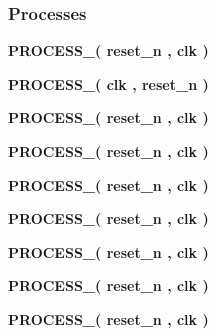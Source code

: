 \subsubsection*{Processes}
 \begin{DoxyCompactItemize}
\item 
{\bf P\+R\+O\+C\+E\+S\+S\+\_}{\bfseries  ( {\bfseries {\bfseries {\bf reset\+\_\+n}} \textcolor{vhdlchar}{ }} , {\bfseries {\bfseries {\bf clk}} \textcolor{vhdlchar}{ }} )}
\item 
{\bf P\+R\+O\+C\+E\+S\+S\+\_}{\bfseries  ( {\bfseries {\bfseries {\bf clk}} \textcolor{vhdlchar}{ }} , {\bfseries {\bfseries {\bf reset\+\_\+n}} \textcolor{vhdlchar}{ }} )}
\item 
{\bf P\+R\+O\+C\+E\+S\+S\+\_}{\bfseries  ( {\bfseries {\bfseries {\bf reset\+\_\+n}} \textcolor{vhdlchar}{ }} , {\bfseries {\bfseries {\bf clk}} \textcolor{vhdlchar}{ }} )}
\item 
{\bf P\+R\+O\+C\+E\+S\+S\+\_}{\bfseries  ( {\bfseries {\bfseries {\bf reset\+\_\+n}} \textcolor{vhdlchar}{ }} , {\bfseries {\bfseries {\bf clk}} \textcolor{vhdlchar}{ }} )}
\item 
{\bf P\+R\+O\+C\+E\+S\+S\+\_}{\bfseries  ( {\bfseries {\bfseries {\bf reset\+\_\+n}} \textcolor{vhdlchar}{ }} , {\bfseries {\bfseries {\bf clk}} \textcolor{vhdlchar}{ }} )}
\item 
{\bf P\+R\+O\+C\+E\+S\+S\+\_}{\bfseries  ( {\bfseries {\bfseries {\bf reset\+\_\+n}} \textcolor{vhdlchar}{ }} , {\bfseries {\bfseries {\bf clk}} \textcolor{vhdlchar}{ }} )}
\item 
{\bf P\+R\+O\+C\+E\+S\+S\+\_}{\bfseries  ( {\bfseries {\bfseries {\bf reset\+\_\+n}} \textcolor{vhdlchar}{ }} , {\bfseries {\bfseries {\bf clk}} \textcolor{vhdlchar}{ }} )}
\item 
{\bf P\+R\+O\+C\+E\+S\+S\+\_}{\bfseries  ( {\bfseries {\bfseries {\bf reset\+\_\+n}} \textcolor{vhdlchar}{ }} , {\bfseries {\bfseries {\bf clk}} \textcolor{vhdlchar}{ }} )}
\item 
{\bf P\+R\+O\+C\+E\+S\+S\+\_}{\bfseries  ( {\bfseries {\bfseries {\bf reset\+\_\+n}} \textcolor{vhdlchar}{ }} , {\bfseries {\bfseries {\bf clk}} \textcolor{vhdlchar}{ }} )}
\end{DoxyCompactItemize}
